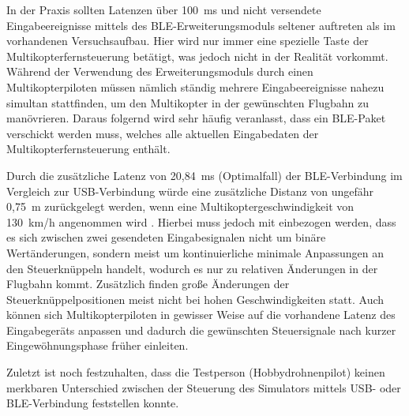 In der Praxis sollten Latenzen über 100~ms und nicht versendete Eingabeereignisse mittels des \ac{BLE}-Erweiterungsmoduls seltener auftreten als im vorhandenen Versuchsaufbau. Hier wird nur immer eine spezielle Taste der Multikopterfernsteuerung betätigt, was jedoch nicht in der Realität vorkommt. Während der Verwendung des Erweiterungsmoduls durch einen Multikopterpiloten müssen nämlich ständig mehrere Eingabeereignisse nahezu simultan stattfinden, um den Multikopter in der gewünschten Flugbahn zu manövrieren. Daraus folgernd wird sehr häufig veranlasst, dass ein \ac{BLE}-Paket verschickt werden muss, welches alle aktuellen Eingabedaten der Multikopterfernsteuerung enthält.

Durch die zusätzliche Latenz von 20,84~ms (Optimalfall) der \ac{BLE}-Verbindung im Vergleich zur \acs{USB}-Verbindung würde eine zusätzliche Distanz von ungefähr 0,75~m zurückgelegt werden, wenn eine Multikoptergeschwindigkeit von 130~km/h angenommen wird \cites{droneSpeed1}{droneSpeed2}{droneSpeed3}. Hierbei muss jedoch mit einbezogen werden, dass es sich zwischen zwei gesendeten Eingabesignalen nicht um binäre Wertänderungen, sondern meist um kontinuierliche minimale Anpassungen an den Steuerknüppeln handelt, wodurch es nur zu relativen Änderungen in der Flugbahn kommt. Zusätzlich finden große Änderungen der Steuerknüppelpositionen meist nicht bei hohen Geschwindigkeiten statt. Auch können sich Multikopterpiloten in gewisser Weise auf die vorhandene Latenz des Eingabegeräts anpassen und dadurch die gewünschten Steuersignale nach kurzer Eingewöhnungsphase früher einleiten.

Zuletzt ist noch festzuhalten, dass die Testperson (Hobbydrohnenpilot) keinen merkbaren Unterschied zwischen der Steuerung des Simulators mittels \acs{USB}- oder \ac{BLE}-Verbindung feststellen konnte.